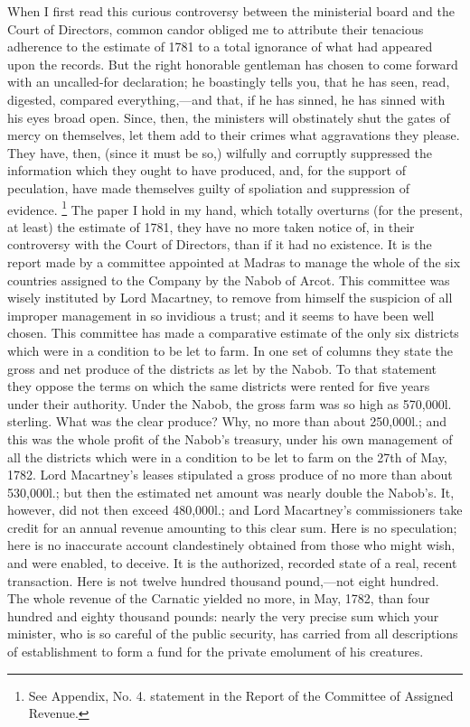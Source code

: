 When I first read this curious controversy between the ministerial board and the Court of Directors, common candor obliged me to attribute their tenacious adherence to the estimate of 1781 to a total ignorance of what had appeared upon the records. But the right honorable gentleman has chosen to come forward with an uncalled-for declaration; he boastingly tells you, that he has seen, read, digested, compared everything,—and that, if he has sinned, he has sinned with his eyes broad open. Since, then, the ministers will obstinately shut the gates of mercy on themselves, let them add to their crimes what aggravations they please. They have, then, (since it must be so,) wilfully and corruptly suppressed the information which they ought to have produced, and, for the support of peculation, have made themselves guilty of spoliation and suppression of evidence.
\footnote{ See Appendix, No. 4. statement in the Report of the Committee of Assigned Revenue.}
 The paper I hold in my hand, which totally overturns (for the present, at least) the estimate of 1781, they have no more taken notice of, in their controversy with the Court of Directors, than if it had no existence. It is the report made by a committee appointed at Madras to manage the whole of the six countries assigned to the Company by the Nabob of Arcot. This committee was wisely instituted by Lord Macartney, to remove from himself the suspicion of all improper management in so invidious a trust; and it seems to have been well chosen. This committee has made a comparative estimate of the only six districts which were in a condition to be let to farm. In one set of columns they state the gross and net produce of the districts as let by the Nabob. To that statement they oppose the terms on which the same districts were rented for five years under their authority. Under the Nabob, the gross farm was so high as 570,000l. sterling. What was the clear produce? Why, no more than about 250,000l.; and this was the whole profit of the Nabob's treasury, under his own management of all the districts which were in a condition to be let to farm on the 27th of May, 1782. Lord Macartney's leases stipulated a gross produce of no more than about 530,000l.; but then the estimated net amount was nearly double the Nabob's. It, however, did not then exceed 480,000l.; and Lord Macartney's commissioners take credit for an annual revenue amounting to this clear sum. Here is no speculation; here is no inaccurate account clandestinely obtained from those who might wish, and were enabled, to deceive. It is the authorized, recorded state of a real, recent transaction. Here is not twelve hundred thousand pound,—not eight hundred. The whole revenue of the Carnatic yielded no more, in May, 1782, than four hundred and eighty thousand pounds: nearly the very precise sum which your minister, who is so careful of the public security, has carried from all descriptions of establishment to form a fund for the private emolument of his creatures.

